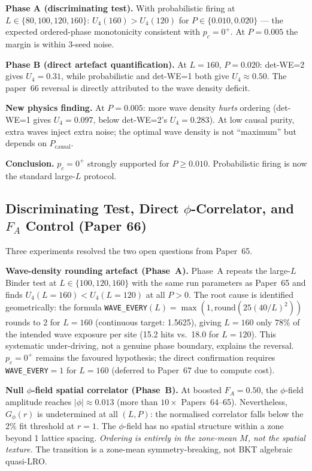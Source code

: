 \documentclass[11pt]{article}
\begin{document}
\textbf{Phase A (discriminating test).}
With probabilistic firing at $L\in\{80,100,120,160\}$:
$U_4(160)>U_4(120)$ for $P\in\{0.010,0.020\}$ — the expected
ordered-phase monotonicity consistent with $p_c=0^+$.
At $P=0.005$ the margin is within 3-seed noise.

\textbf{Phase B (direct artefact quantification).}
At $L=160$, $P=0.020$: det-WE=2 gives $U_4=0.31$,
while probabilistic and det-WE=1 both give $U_4\approx0.50$.
The paper~66 reversal is directly attributed to the wave density deficit.

\textbf{New physics finding.}
At $P=0.005$: more wave density \emph{hurts} ordering (det-WE=1 gives
$U_4=0.097$, below det-WE=2's $U_4=0.283$).
At low causal purity, extra waves inject extra noise; the optimal wave
density is not ``maximum'' but depends on $P_\text{causal}$.

\textbf{Conclusion.} $p_c=0^+$ strongly supported for $P\ge0.010$.
Probabilistic firing is now the standard large-$L$ protocol.

\subsection{Discriminating Test, Direct $\phi$-Correlator, and $F_A$ Control (Paper 66)}

Three experiments resolved the two open questions from Paper~65.

\textbf{Wave-density rounding artefact (Phase~A).}
Phase~A repeats the large-$L$ Binder test at $L \in \{100,120,160\}$
with the same run parameters as Paper~65 and finds
$U_4(L=160) < U_4(L=120)$ at all $P > 0$.
The root cause is identified geometrically:
the formula \texttt{WAVE\_EVERY}$(L) = \max(1, \text{round}(25(40/L)^2))$
rounds to 2 for $L=160$ (continuous target: 1.5625),
giving $L=160$ only $78\%$ of the intended wave exposure per site
(15.2 hits vs.\ 18.0 for $L=120$).
This systematic under-driving, not a genuine phase boundary, explains the reversal.
$p_c = 0^+$ remains the favoured hypothesis; the direct confirmation requires
\texttt{WAVE\_EVERY}$=1$ for $L=160$ (deferred to Paper~67 due to compute cost).

\textbf{Null $\phi$-field spatial correlator (Phase~B).}
At boosted $F_A = 0.50$, the $\phi$-field amplitude reaches $|\phi| \approx 0.013$
(more than $10\times$ Papers~64--65).
Nevertheless, $G_\phi(r)$ is undetermined at all $(L,P)$:
the normalised correlator falls below the 2\% fit threshold at $r=1$.
The $\phi$-field has no spatial structure within a zone beyond 1 lattice spacing.
\emph{Ordering is entirely in the zone-mean $M$, not the spatial texture.}
The transition is a zone-mean symmetry-breaking, not BKT algebraic quasi-LRO.
\end{document}
